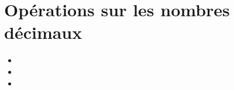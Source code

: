 \chapter{Opérations sur les nombres décimaux}\label{ChOpNombresDecimaux}

\vspace{5cm}
\begin{acquis}
\begin{itemize}
\item 
\item 
\item 
\end{itemize}
\end{acquis}


%

\cours


\exercicesbase
\begin{colonne*exercice}

\end{colonne*exercice}


\exercicesappr
\begin{colonne*exercice}

\end{colonne*exercice}

\connaissances


\TravauxPratiques


\recreation %



